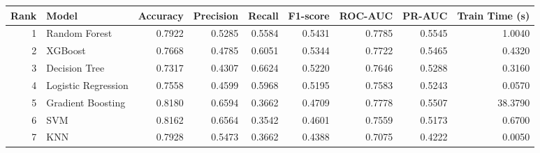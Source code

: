 \begin{tabular}{rlrrrrrrr}
\toprule
Rank & Model & Accuracy & Precision & Recall & F1-score & ROC-AUC & PR-AUC & Train Time (s) \\
\midrule
1 & Random Forest & 0.7922 & 0.5285 & 0.5584 & 0.5431 & 0.7785 & 0.5545 & 1.0040 \\
2 & XGBoost & 0.7668 & 0.4785 & 0.6051 & 0.5344 & 0.7722 & 0.5465 & 0.4320 \\
3 & Decision Tree & 0.7317 & 0.4307 & 0.6624 & 0.5220 & 0.7646 & 0.5288 & 0.3160 \\
4 & Logistic Regression & 0.7558 & 0.4599 & 0.5968 & 0.5195 & 0.7583 & 0.5243 & 0.0570 \\
5 & Gradient Boosting & 0.8180 & 0.6594 & 0.3662 & 0.4709 & 0.7778 & 0.5507 & 38.3790 \\
6 & SVM & 0.8162 & 0.6564 & 0.3542 & 0.4601 & 0.7559 & 0.5173 & 0.6700 \\
7 & KNN & 0.7928 & 0.5473 & 0.3662 & 0.4388 & 0.7075 & 0.4222 & 0.0050 \\
\bottomrule
\end{tabular}
